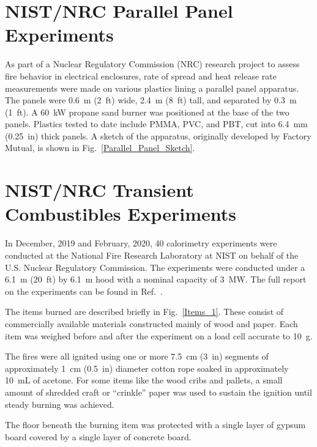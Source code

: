 \section{NIST/NRC Parallel Panel Experiments}
\label{NIST_NRC_Parallel_Panels_Description}

As part of a Nuclear Regulatory Commission (NRC) research project to assess fire behavior in electrical enclosures, rate of spread and heat release rate measurements were made on various plastics lining a parallel panel apparatus. The panels were 0.6~m (2~ft) wide, 2.4~m (8~ft) tall, and separated by 0.3~m (1~ft). A 60~kW propane sand burner was positioned at the base of the two panels. Plastics tested to date include PMMA, PVC, and PBT, cut into 6.4~mm (0.25~in) thick panels. A sketch of the apparatus, originally developed by Factory Mutual, is shown in Fig.~\ref{Parallel_Panel_Sketch}.


\section{NIST/NRC Transient Combustibles Experiments}
\label{NIST_NRC_Transient_Combustibles_Description}

In December, 2019 and February, 2020, 40 calorimetry experiments were conducted at the National Fire Research Laboratory at NIST on behalf of the U.S. Nuclear Regulatory Commission. The experiments were conducted under a 6.1~m (20~ft) by 6.1~m hood with a nominal capacity of 3~MW. The full report on the experiments can be found in Ref.~\cite{McGrattan:Multiple_Transients_2020}.

The items burned are described briefly in Fig.~\ref{Items_1}. These consist of commercially available materials constructed mainly of wood and paper. Each item was weighed before and after the experiment on a load cell accurate to 10~g.

The fires were all ignited using one or more 7.5~cm (3~in) segments of approximately 1~cm (0.5~in) diameter cotton rope soaked in approximately 10~mL of acetone. For some items like the wood cribs and pallets, a small amount of shredded craft or ``crinkle'' paper was used to sustain the ignition until steady burning was achieved.

The floor beneath the burning item was protected with a single layer of gypsum board covered by a single layer of concrete board.


